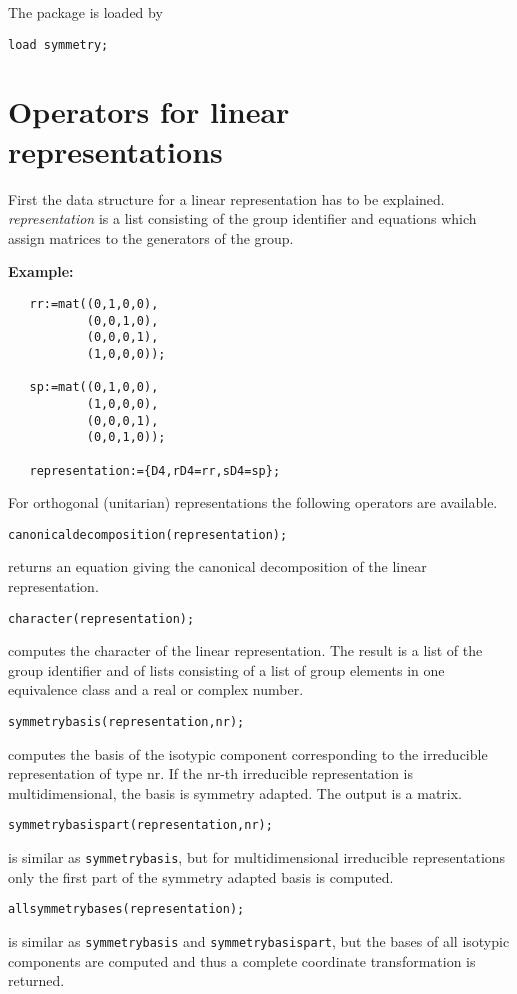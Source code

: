 The package is loaded by

{\tt load symmetry;}

\section{Operators for linear representations}

First the data structure for a linear representation has to be explained.
{\em representation} is a list consisting of the group identifier and
equations which assign matrices to the generators of the group.

{\bf Example:}
\begin{verbatim}
   rr:=mat((0,1,0,0),
           (0,0,1,0),
           (0,0,0,1),
           (1,0,0,0));

   sp:=mat((0,1,0,0),
           (1,0,0,0),
           (0,0,0,1),
           (0,0,1,0));

   representation:={D4,rD4=rr,sD4=sp};
\end{verbatim}

For orthogonal (unitarian) representations the following operators
are available.

{\tt canonicaldecomposition(representation);}

returns an equation giving the canonical decomposition of the linear
representation.

{\tt character(representation);}

computes the character of the linear representation. The result is a list
of the group identifier and of lists consisting of a
list of group elements in one equivalence class and a real or complex number.

{\tt symmetrybasis(representation,nr);}

computes the basis of the isotypic component corresponding to the irreducible
representation of type nr. If the nr-th irreducible representation is
multidimensional, the basis is symmetry adapted. The output is a matrix.

{\tt symmetrybasispart(representation,nr);}

is similar as {\tt symmetrybasis}, but for multidimensional
irreducible representations only the first part of the
symmetry adapted basis is computed.

{\tt allsymmetrybases(representation);}

is similar as {\tt symmetrybasis} and {\tt symmetrybasispart},
but the bases of all
isotypic components are computed and thus a
complete coordinate transformation is returned.

